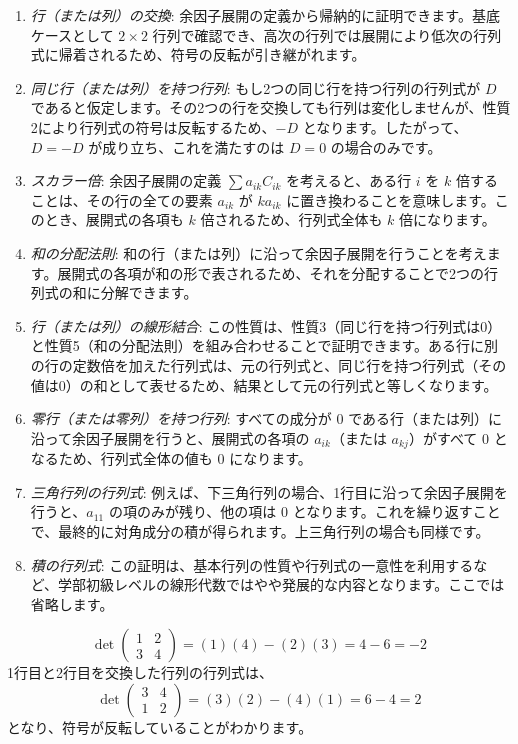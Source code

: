 \begin{thm}[行列式の性質]
\begin{proof*}
\begin{enumerate}
    \item \emph{行（または列）の交換}: 余因子展開の定義から帰納的に証明できます。基底ケースとして $2 \times 2$ 行列で確認でき、高次の行列では展開により低次の行列式に帰着されるため、符号の反転が引き継がれます。
    \item \emph{同じ行（または列）を持つ行列}: もし2つの同じ行を持つ行列の行列式が $D$ であると仮定します。その2つの行を交換しても行列は変化しませんが、性質2により行列式の符号は反転するため、$-D$ となります。したがって、$D = -D$ が成り立ち、これを満たすのは $D=0$ の場合のみです。
    \item \emph{スカラー倍}: 余因子展開の定義 $\sum a_{ik}C_{ik}$ を考えると、ある行 $i$ を $k$ 倍することは、その行の全ての要素 $a_{ik}$ が $k a_{ik}$ に置き換わることを意味します。このとき、展開式の各項も $k$ 倍されるため、行列式全体も $k$ 倍になります。
    \item \emph{和の分配法則}: 和の行（または列）に沿って余因子展開を行うことを考えます。展開式の各項が和の形で表されるため、それを分配することで2つの行列式の和に分解できます。
    \item \emph{行（または列）の線形結合}: この性質は、性質3（同じ行を持つ行列式は0）と性質5（和の分配法則）を組み合わせることで証明できます。ある行に別の行の定数倍を加えた行列式は、元の行列式と、同じ行を持つ行列式（その値は0）の和として表せるため、結果として元の行列式と等しくなります。
    \item \emph{零行（または零列）を持つ行列}: すべての成分が $0$ である行（または列）に沿って余因子展開を行うと、展開式の各項の $a_{ik}$（または $a_{kj}$）がすべて $0$ となるため、行列式全体の値も $0$ になります。
    \item \emph{三角行列の行列式}: 例えば、下三角行列の場合、1行目に沿って余因子展開を行うと、$a_{11}$ の項のみが残り、他の項は $0$ となります。これを繰り返すことで、最終的に対角成分の積が得られます。上三角行列の場合も同様です。
    \item \emph{積の行列式}: この証明は、基本行列の性質や行列式の一意性を利用するなど、学部初級レベルの線形代数ではやや発展的な内容となります。ここでは省略します。
\end{enumerate}
\end{proof*}
\end{thm}

\begin{ex}
    \[\det\begin{pmatrix} 1 & 2 \\ 3 & 4 \end{pmatrix} = (1)(4)-(2)(3) = 4-6=-2\]
    1行目と2行目を交換した行列の行列式は、
    \[\det\begin{pmatrix} 3 & 4 \\ 1 & 2 \end{pmatrix} = (3)(2)-(4)(1) = 6-4=2\]
    となり、符号が反転していることがわかります。
\end{ex}

